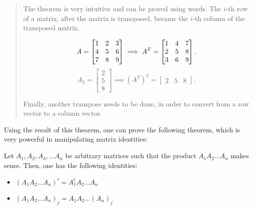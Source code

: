 \begin{quote}
  The theorem is very intuitive and can be proved using words. The \( i \)-th
  row of a matrix, after the matrix is transposed, became the \( i \)-th column
  of the transposed matrix.

  \[
    A = \begin{bmatrix}
      1 & 2 & 3 \\
      4 & 5 & 6 \\
      7 & 8 & 9
      \end{bmatrix} \implies A^{T} = \begin{bmatrix}
      1 & 4 & 7 \\
      2 & 5 & 8 \\
      3 & 6 & 9
    \end{bmatrix} \\
  .\]
  \[
    A_{2} = \begin{bmatrix} 2 \\ 5 \\ 8 \end{bmatrix} \implies
    (A^{T})^{2} = \begin{bmatrix} 2 & 5 & 8 \end{bmatrix} 
  .\] 

  Finally, another transpose needs to be done, in order to convert from a row
  vector to a column vector.
\end{quote}

Using the result of this theorem, one can prove the following theorem, which is
very powerful in manipulating matrix identities:

\begin{theorem}
\label{thr:row-col-xtract}
  Let \( A_{1}, A_{2}, A_{3}, \ldots A_{n} \) be arbitrary matrices such that
  the product \( A_{1}A_{2}\ldots A_{n}  \) makes sense. Then, one has the
  following identities:

  \begin{itemize}
    \item \( (A_{1}A_{2}\ldots A_{n})^{i} = A_{1}^{i}A_{2}\ldots A_{n} \)
    \item \( (A_{1}A_{2}\ldots A_{n})_{j} = A_{1}A_{2}\ldots (A_{n})_{j} \)
  \end{itemize}
\end{theorem}

